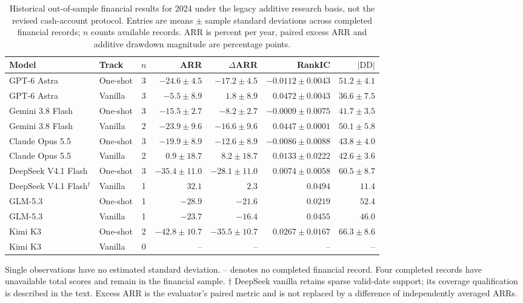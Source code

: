 \begin{table}[htbp]
\centering
\footnotesize
\caption{Historical out-of-sample financial results for 2024 under the legacy additive research basis, not the revised cash-account protocol. Entries are means $\pm$ sample standard deviations across completed financial records; $n$ counts available records. ARR is percent per year, paired excess ARR and additive drawdown magnitude are percentage points.}
\label{tab:leaderboard}
\setlength{\tabcolsep}{3pt}
\begin{tabular}{@{}llcrrrr@{}}
\toprule
Model & Track & $n$ & ARR & $\Delta$ARR & RankIC & $|\mathrm{DD}|$ \\
\midrule
GPT-6 Astra & One-shot & 3 & $-24.6 \pm 4.5$ & $-17.2 \pm 4.5$ & $-0.0112 \pm 0.0043$ & $51.2 \pm 4.1$ \\
GPT-6 Astra & Vanilla & 3 & $-5.5 \pm 8.9$ & $1.8 \pm 8.9$ & $0.0472 \pm 0.0043$ & $36.6 \pm 7.5$ \\
Gemini 3.8 Flash & One-shot & 3 & $-15.5 \pm 2.7$ & $-8.2 \pm 2.7$ & $-0.0009 \pm 0.0075$ & $41.7 \pm 3.5$ \\
Gemini 3.8 Flash & Vanilla & 2 & $-23.9 \pm 9.6$ & $-16.6 \pm 9.6$ & $0.0447 \pm 0.0001$ & $50.1 \pm 5.8$ \\
Claude Opus 5.5 & One-shot & 3 & $-19.9 \pm 8.9$ & $-12.6 \pm 8.9$ & $-0.0086 \pm 0.0088$ & $43.8 \pm 4.0$ \\
Claude Opus 5.5 & Vanilla & 2 & $0.9 \pm 18.7$ & $8.2 \pm 18.7$ & $0.0133 \pm 0.0222$ & $42.6 \pm 3.6$ \\
DeepSeek V4.1 Flash & One-shot & 3 & $-35.4 \pm 11.0$ & $-28.1 \pm 11.0$ & $0.0074 \pm 0.0058$ & $60.5 \pm 8.7$ \\
DeepSeek V4.1 Flash$^{\dagger}$ & Vanilla & 1 & $32.1$ & $2.3$ & $0.0494$ & $11.4$ \\
GLM-5.3 & One-shot & 1 & $-28.9$ & $-21.6$ & $0.0219$ & $52.4$ \\
GLM-5.3 & Vanilla & 1 & $-23.7$ & $-16.4$ & $0.0455$ & $46.0$ \\
Kimi K3 & One-shot & 2 & $-42.8 \pm 10.7$ & $-35.5 \pm 10.7$ & $0.0267 \pm 0.0167$ & $66.3 \pm 8.6$ \\
Kimi K3 & Vanilla & 0 & -- & -- & -- & -- \\
\bottomrule
\end{tabular}
\par\smallskip
\begin{minipage}{\linewidth}\footnotesize Single observations have no estimated standard deviation. -- denotes no completed financial record. Four completed records have unavailable total scores and remain in the financial sample. $\dagger$ DeepSeek vanilla retains sparse valid-date support; its coverage qualification is described in the text. Excess ARR is the evaluator's paired metric and is not replaced by a difference of independently averaged ARRs.\end{minipage}
\end{table}

